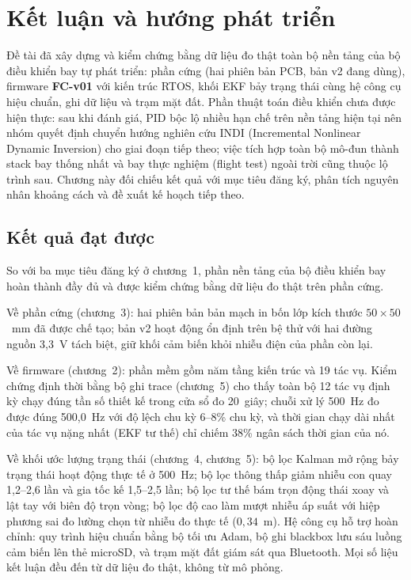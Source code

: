 \chapter{Kết luận và hướng phát triển}

Đề tài đã xây dựng và kiểm chứng bằng dữ liệu đo thật toàn bộ nền tảng của bộ điều khiển bay tự phát triển: phần cứng (hai phiên bản PCB, bản v2 đang dùng), firmware \textbf{FC-v01} với kiến trúc RTOS, khối EKF bảy trạng thái cùng hệ công cụ hiệu chuẩn, ghi dữ liệu và trạm mặt đất. Phần thuật toán điều khiển chưa được hiện thực: sau khi đánh giá, PID bộc lộ nhiều hạn chế trên nền tảng hiện tại nên nhóm quyết định chuyển hướng nghiên cứu INDI (Incremental Nonlinear Dynamic Inversion) cho giai đoạn tiếp theo; việc tích hợp toàn bộ mô-đun thành stack bay thống nhất và bay thực nghiệm (flight test) ngoài trời cũng thuộc lộ trình sau. Chương này đối chiếu kết quả với mục tiêu đăng ký, phân tích nguyên nhân khoảng cách và đề xuất kế hoạch tiếp theo.

\section{Kết quả đạt được}\label{sec:kl-dat}

So với ba mục tiêu đăng ký ở chương~1, phần nền tảng của bộ điều khiển bay hoàn thành đầy đủ và được kiểm chứng bằng dữ liệu đo thật trên phần cứng.

Về phần cứng (chương~3): hai phiên bản bản mạch in bốn lớp kích thước $50\times50$~mm đã được chế tạo; bản v2 hoạt động ổn định trên bệ thử với hai đường nguồn 3,3~V tách biệt, giữ khối cảm biến khỏi nhiễu điện của phần còn lại.

Về firmware (chương~2): phần mềm gồm năm tầng kiến trúc và 19 tác vụ. Kiểm chứng định thời bằng bộ ghi trace (chương~5) cho thấy toàn bộ 12 tác vụ định kỳ chạy đúng tần số thiết kế trong cửa sổ đo 20~giây; chuỗi xử lý 500~Hz đo được đúng 500,0~Hz với độ lệch chu kỳ 6--8\% chu kỳ, và thời gian chạy dài nhất của tác vụ nặng nhất (EKF tư thế) chỉ chiếm 38\% ngân sách thời gian của nó.

Về khối ước lượng trạng thái (chương~4, chương~5): bộ lọc Kalman mở rộng bảy trạng thái hoạt động thực tế ở 500~Hz; bộ lọc thông thấp giảm nhiễu con quay 1,2--2,6 lần và gia tốc kế 1,5--2,5 lần; bộ lọc tư thế bám trọn động thái xoay và lật tay với biên độ trọn vòng; bộ lọc độ cao làm mượt nhiễu áp suất với hiệp phương sai đo lường chọn từ nhiễu đo thực tế ($0{,}34$~m). Hệ công cụ hỗ trợ hoàn chỉnh: quy trình hiệu chuẩn bằng bộ tối ưu Adam, bộ ghi blackbox lưu sáu luồng cảm biến lên thẻ microSD, và trạm mặt đất giám sát qua Bluetooth. Mọi số liệu kết luận đều đến từ dữ liệu đo thật, không từ mô phỏng.

